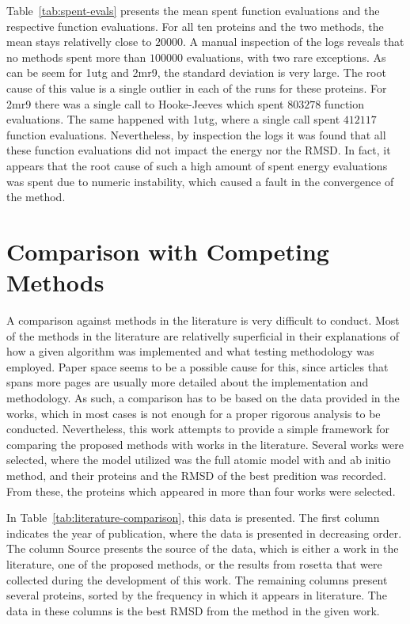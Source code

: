 Table~\ref{tab:spent-evals} presents the mean spent function evaluations and
the respective function evaluations. For all ten proteins and the two methods,
the mean stays relativelly close to $20000$. A manual inspection of the logs
reveals that no methods spent more than $100000$ evaluations, with two rare
exceptions. As can be seem for 1utg and 2mr9, the standard deviation is very
large. The root cause of this value is a single outlier in each of the runs
for these proteins. For 2mr9 there was a single call to Hooke-Jeeves which spent
$803278$ function evaluations. The same happened with 1utg, where a single call
spent $412117$ function evaluations. Nevertheless, by inspection the logs it
was found that all these function evaluations did not impact the energy nor the
RMSD. In fact, it appears that the root cause of such a high amount of
spent energy evaluations was spent due to numeric instability, which caused
a fault in the convergence of the method.

\section{Comparison with Competing Methods}

A comparison against methods in the literature is very difficult to conduct.
Most of the methods in the literature are relativelly superficial in their
explanations of how a given algorithm was implemented and what testing
methodology was employed. Paper space seems to be a possible cause for this,
since articles that spans more pages are usually more detailed about the
implementation and methodology. As such, a comparison has to be based on the
data provided in the works, which in most cases is not enough for a proper
rigorous analysis to be conducted. Nevertheless, this work attempts to provide
a simple framework for comparing the proposed methods with works in the
literature. Several works were selected, where the model utilized was the
full atomic model with and ab initio method, and their proteins and the RMSD
of the best predition was recorded. From these, the proteins which appeared in
more than four works were selected.



In Table~\ref{tab:literature-comparison}, this data is presented. The first
column indicates the year of publication, where the data is presented in
decreasing order. The column Source presents the source of the data, which is
either a work in the literature, one of the proposed methods, or the results
from rosetta that were collected during the development of this work. The
remaining columns present several proteins, sorted by the frequency in which it
appears in literature. The data in these columns is the best RMSD from the
method in the given work.

